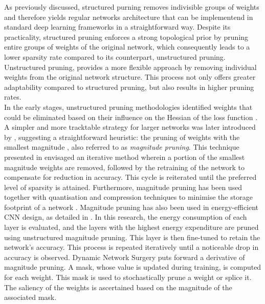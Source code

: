 As previously discussed, structured purning removes indivisible groups of
weights and therefore yields regular networks architecture that can be
implementend in standard deep learning frameworks in a straightforward way.
Despite its practicality, structured pruning enforces a strong topological prior
by pruning entire groups of weights of the original network, which consequently
leads to a lower sparsity rate compared to its counterpart, unstructured
pruning. Unstructured pruning, provides a more flexible approach by removing
individual weights from the original network structure. This process not only
offers greater adaptability compared to structured pruning, but also results in
higher pruning rates.\\

In the early stages, unstructured pruning methodologies identified weights that
could be eliminated based on their influence on the Hessian of the loss function
\cite{DBLP:conf/nips/CunDS89,DBLP:conf/icnn/HassibiSW93,DBLP:conf/nips/HassibiSW93}.
A simpler and more tracktable strategy for larger networks was later introduced
by \citeauthor{DBLP:conf/nips/HanPTD15}, suggesting a straightforward
heuristic: the pruning of weights with the smallest magnitude
\cite{DBLP:conf/nips/HanPTD15}, also referred to as \emph{magnitude
pruning}. This technique presented in \cite{DBLP:conf/nips/HanPTD15} envisaged
an iterative method wherein a portion of the smallest magnitude weights are
removed, followed by the retraining of the network to compensate for reduction
in accuracy. This cycle is reiterated until the preferred level of sparsity is
attained. Furthermore, magnitude pruning has been used together with
quantisation and compression techniques to minimise the storage footprint of a
network \cite{DBLP:journals/corr/HanMD15}. Magnitude pruning has also been used
in energy-efficient \ac{CNN} design, as detailed in
\cite{DBLP:conf/cvpr/YangCS17}. In this research, the energy consumption of each
layer is evaluated, and the layers with the highest energy expenditure are
pruned using unstructured magnitude pruning. This layer is then fine-tuned to
retain the network's accuracy. This process is repeated iteratively until a
noticeable drop in accuracy is observed. Dynamic Network Surgery
\cite{DBLP:conf/nips/GuoYC16} puts forward a derivative of magnitude pruning. A
mask, whose value is updated during training, is computed for each weight. This
mask is used to stochastically prune a weight or splice it. The saliency of the
weights is ascertained based on the magnitude of the associated mask.\\


